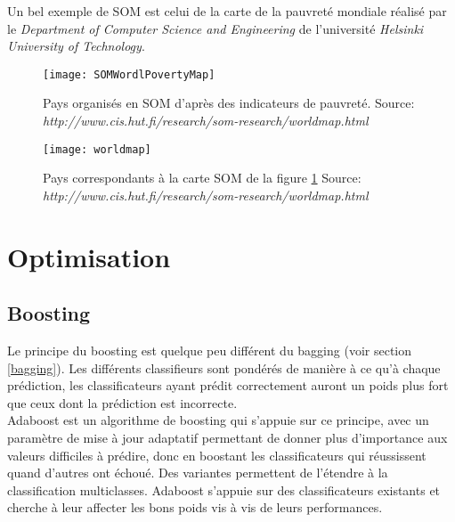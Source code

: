 \noindent Un bel exemple de SOM est celui de la carte de la pauvreté mondiale réalisé par le \textit{Department of Computer Science and Engineering} de l'université \textit{Helsinki University of Technology}. 

\begin{figure}[H]
	\texttt{[image: SOMWordlPovertyMap]}
	\caption{\label{SOMPovertyMap} Pays organisés en SOM d'après des indicateurs de pauvreté. \newline Source: \textit{http://www.cis.hut.fi/research/som-research/worldmap.html}}
\end{figure}

\begin{figure}[H]
	\texttt{[image: worldmap]}
	\caption{\label{WorldPovertyMap} Pays correspondants à la carte SOM de la figure \ref{SOMPovertyMap} \newline Source: \textit{http://www.cis.hut.fi/research/som-research/worldmap.html}}
\end{figure}





\newpage
\section{Optimisation}

\subsection{Boosting}
Le principe du boosting est quelque peu différent du bagging (voir section \ref{bagging}). Les différents classifieurs sont pondérés de manière à ce qu’à chaque prédiction, les classificateurs ayant prédit correctement auront un poids plus fort que ceux dont la prédiction est incorrecte.\\


\noindent Adaboost est un algorithme de boosting qui s’appuie sur ce principe, avec un paramètre de mise à jour adaptatif permettant de donner plus d’importance aux valeurs difficiles à prédire, donc en boostant les classificateurs qui réussissent quand d’autres ont échoué. Des variantes permettent de l’étendre à la classification multiclasses. Adaboost s’appuie sur des classificateurs existants et cherche à leur affecter les bons poids vis à vis de leurs performances\cite{EnsembleMethods}.\\



